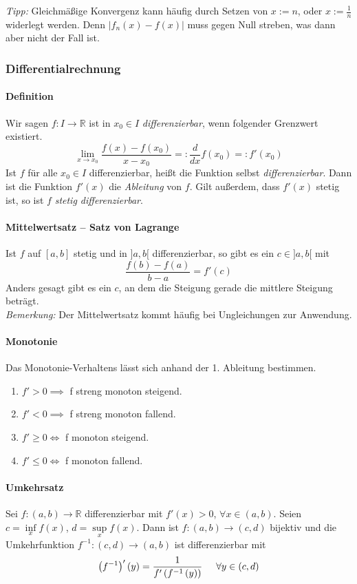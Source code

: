 \documentclass[a4paper, 9pt, DIV=24]{scrartcl}
\newcommand{\R}{\mathbb{R}}
\begin{document}
\emph{Tipp: } Gleichmäßige Konvergenz kann häufig durch Setzen von $x := n$, oder $x := \frac{1}{n}$ widerlegt werden.
Denn $|f_n(x) - f(x)|$ muss gegen Null streben, was dann aber nicht der Fall ist.

\subsubsection{Differentialrechnung}

\paragraph{Definition}
Wir sagen $f: I \rightarrow \R$ ist in $x_0 \in I$ \emph{differenzierbar}, wenn folgender Grenzwert existiert.
\[
 \lim_{x\rightarrow x_0} \dfrac{f(x) - f(x_0)}{x - x_0} =: \dfrac{d}{dx} f(x_0) =: f'(x_0)
\]
Ist $f$ für alle $x_0 \in I$ differenzierbar, heißt die Funktion selbst \emph{differenzierbar}.
Dann ist die Funktion $f'(x)$ die \emph{Ableitung} von $f$.
Gilt außerdem, dass $f'(x)$ stetig ist, so ist $f$ \emph{stetig differenzierbar}.

\paragraph{Mittelwertsatz -- Satz von Lagrange}
Ist $f$ auf $[a,b]$ stetig und in $]a,b[$ differenzierbar, so gibt es ein $c \in ]a,b[$ mit
\[ \dfrac{f(b) - f(a)}{b-a} = f'(c) \]
Anders gesagt gibt es ein $c$, an dem die Steigung gerade die mittlere Steigung beträgt.\\
\emph{Bemerkung:} Der Mittelwertsatz kommt häufig bei Ungleichungen zur Anwendung.

\paragraph{Monotonie}
Das Monotonie-Verhaltens lässt sich anhand der 1. Ableitung bestimmen.
\begin{enumerate}[label={(}\arabic*{)}]
 \item $f' > 0 \implies $ f streng monoton steigend.
 \item $f' < 0 \implies $ f streng monoton fallend.
 \item $f' \geq 0 \iff $ f monoton steigend.
 \item $f' \leq 0 \iff $ f monoton fallend.
\end{enumerate}

\paragraph{Umkehrsatz}
Sei $f:\left( a,b\right)\to\R$ differenzierbar mit $f'(x)>0$, $\forall x\in\left( a,b\right)$. Seien $c = \mathop {\inf }\limits_x f\left( x \right)$, $d = \mathop {\sup }\limits_x f\left( x \right)$. Dann ist $f:\left( a,b\right)\to\left( c,d\right)$ bijektiv und die Umkehrfunktion $f^{-1}:\left( c,d\right)\to\left( a,b\right)$ ist differenzierbar mit
\[\left( {{f^{ - 1}}} \right)'\left(y \right) = \frac{1}{{f'\left( {{f^{ - 1}}}\left( y\right) \right)}}\hspace{5mm}\forall y \in \left( {c,d} \right)\]
\end{document}

